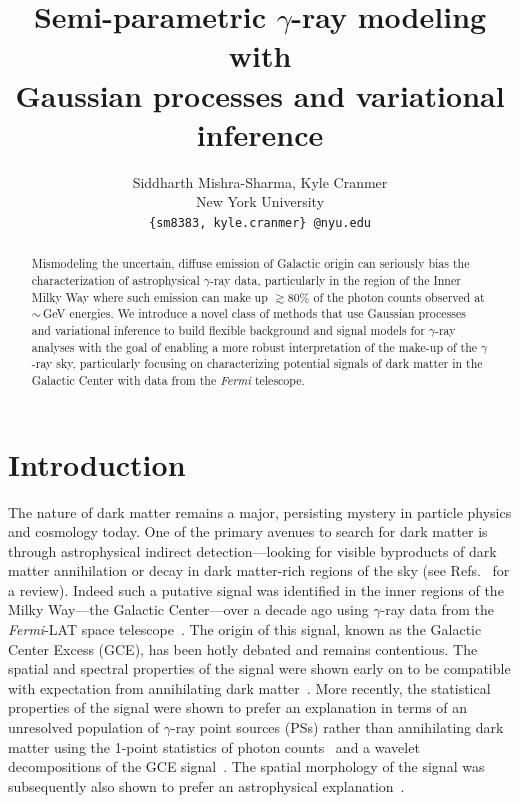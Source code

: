 \documentclass[]{article}
\title{Semi-parametric $\gamma$-ray modeling with \\ Gaussian processes and variational inference}
\author{
Siddharth Mishra-Sharma, Kyle Cranmer\\
New York University \\
\texttt{\{sm8383,\,kyle.cranmer\}\,@nyu.edu} \\
}
\begin{document}
\maketitle

\begin{abstract}
Mismodeling the uncertain, diffuse emission of Galactic origin can seriously bias the characterization of astrophysical $\gamma$-ray data, particularly in the region of the Inner Milky Way where such emission can make up $\gtrsim80\%$ of the photon counts observed at $\sim$\,GeV energies. We introduce a novel class of methods that use Gaussian processes and variational inference to build flexible background and signal models for $\gamma$-ray analyses with the goal of enabling a more robust interpretation of the make-up of the $\gamma$-ray sky, particularly focusing on characterizing potential signals of dark matter in the Galactic Center with data from the \emph{Fermi} telescope.
\end{abstract}

\section{Introduction}
\label{sec:intro}

The nature of dark matter remains a major, persisting mystery in particle physics and cosmology today. One of the primary avenues to search for dark matter is through astrophysical indirect detection---looking for visible byproducts of dark matter annihilation or decay in dark matter-rich regions of the sky (see Refs.~\cite{Slatyer:2017sev,Lisanti:2016jxe} for a review). Indeed such a putative signal was identified in the inner regions of the Milky Way---the Galactic Center---over a decade ago using $\gamma$-ray data from the \emph{Fermi}-LAT space telescope~\cite{Goodenough:2009gk}. The origin of this signal, known as the Galactic Center Excess (GCE), has been hotly debated and remains contentious. The spatial and spectral properties of the signal were shown early on to be compatible with expectation from annihilating dark matter~\cite{Hooper:2010mq,Daylan:2014rsa}. More recently, the statistical properties of the signal were shown to prefer an explanation in terms of an unresolved population of $\gamma$-ray point sources (PSs) rather than annihilating dark matter using the 1-point statistics of photon counts~\cite{Lee:2015fea} and a wavelet decompositions of the GCE signal~\cite{Bartels:2015aea}. The spatial morphology of the signal was subsequently also shown to prefer an astrophysical explanation~\cite{Macias:2016nev,Macias:2019omb,Bartels:2017vsx}.
\end{document}
